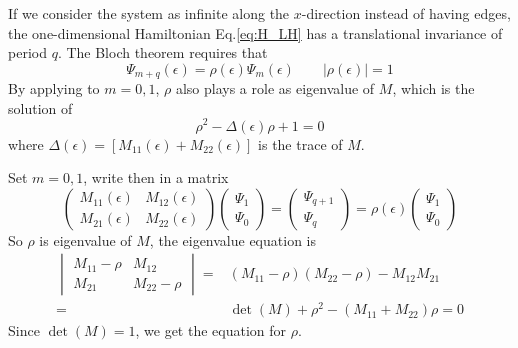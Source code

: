 \documentclass[12pt,a4paper]{article}
\begin{document}
    If we consider the system as infinite along the $x$-direction instead of having edges, the one-dimensional Hamiltonian Eq.\eqref{eq:H_LH} has a translational invariance of period $q$. The Bloch theorem requires that
    \begin{equation}
    \label{eq:Bloch}
        \Psi_{m+q}(\epsilon) = \rho(\epsilon) \Psi_m(\epsilon) \qquad
        |\rho(\epsilon)| = 1
    \end{equation}
    By applying to $m=0,1$, $\rho$ also plays a role as eigenvalue of $M$, which is the solution of
    \begin{equation}
        \rho^2 - \Delta(\epsilon) \rho + 1 = 0
    \end{equation}
    where $\Delta(\epsilon) = \left[M_{11}(\epsilon) + M_{22}(\epsilon)\right]$ is the trace of $M$.
    \begin{prf}
        Set $m=0,1$, write then in a matrix
        \[
            \begin{pmatrix}
                M_{11}(\epsilon) & M_{12}(\epsilon) \\ M_{21}(\epsilon) & M_{22}(\epsilon)
            \end{pmatrix}
            \begin{pmatrix}
                \Psi_{1} \\ \Psi_{0}
            \end{pmatrix}
            =
            \begin{pmatrix}
                \Psi_{q+1} \\ \Psi_{q}
            \end{pmatrix}
            =
            \rho(\epsilon)
            \begin{pmatrix}
                \Psi_{1} \\ \Psi_{0}
            \end{pmatrix}
        \]
        So $\rho$ is eigenvalue of $M$, the eigenvalue equation is
        \[\begin{aligned}
            \begin{vmatrix}
                M_{11}-\rho & M_{12} \\ M_{21} & M_{22}-\rho
            \end{vmatrix}
            = & (M_{11}-\rho)(M_{22}-\rho) - M_{12}M_{21} \\
            = & \det(M) + \rho^2 - (M_{11}+M_{22}) \rho
            = 0
        \end{aligned}
        \]
        Since $\det(M)=1$, we get the equation for $\rho$.
    \end{prf}
\end{document}
